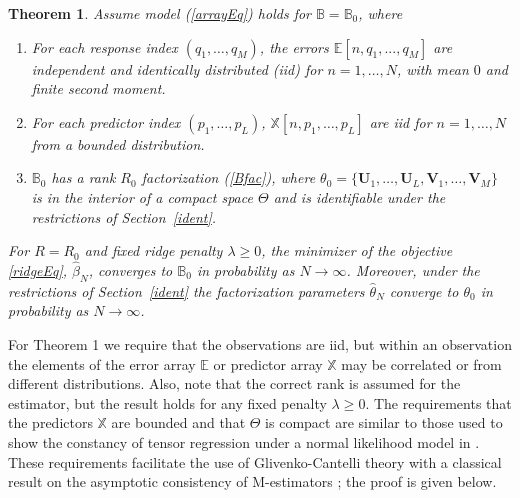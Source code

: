 \documentclass[12pt]{article}
\def\U{\mathbf{U}}
\def\XX{\mathbb{X}}
\def\EE{\mathbb{E}}
\def\V{\mathbf{V}}
\def\BB{\mathbb{B}}
\newtheorem{theorem}{Theorem}
\begin{document}
\begin{theorem}
 Assume model (\ref{arrayEq}) holds for $\BB=\BB_0$, where 
 \begin{enumerate}
 \item For each response index $(q_1,\hdots,q_M)$, the errors $\EE[n,q_1,...,q_M]$ are independent and identically distributed (iid) for $n=1,\hdots,N$, with mean $0$ and finite second moment. 
\item For each predictor index $(p_1,\hdots,p_L)$, $\XX[n,p_1,\hdots,p_L]$ are iid for $n=1,\hdots,N$ from a bounded distribution.   
\item $\BB_0$ has a rank $R_0$ factorization (\ref{Bfac}), where $\theta_0=\{\U_1, \hdots, \U_L, \V_1, \hdots, \V_M\}$ is in the interior of a compact space $\Theta$ and is identifiable under the restrictions of Section~\ref{ident}.  
 \end{enumerate}
For $R=R_0$ and fixed ridge penalty $\lambda\geq0$, the minimizer of the objective \ref{ridgeEq}, $\hat{\beta}_N$, converges to $\BB_0$ in probability as $N\rightarrow \infty$.  Moreover, under the restrictions of Section~\ref{ident} the factorization parameters $\hat{\theta}_N$ converge to $\theta_0$ in probability as $N \rightarrow \infty$.  
\end{theorem}

For Theorem 1 we require that the observations are iid, but within an observation the elements of the error array $\EE$ or predictor array $\XX$ may be correlated or from different distributions.  Also, note that the correct rank is assumed for the estimator, but the result holds for any fixed penalty $\lambda \geq 0$.   The requirements that the predictors $\XX$ are bounded and that $\Theta$ is compact are similar to those used to show the constancy of tensor regression under a normal likelihood model in \citet{zhou2013tensor}.  These requirements facilitate the use of Glivenko-Cantelli theory with a classical result on the asymptotic consistency of M-estimators \citep{van2000asymptotic}; the proof is given below.        
\end{document}
